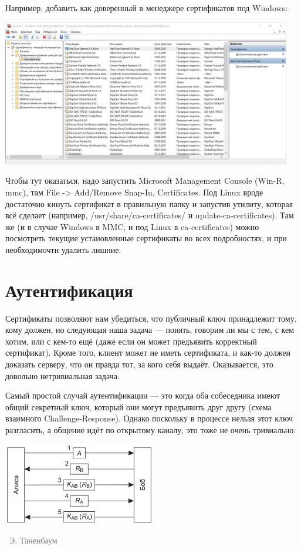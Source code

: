 \documentclass[a5paper]{article}
\newcommand{\attribution}[1] {
\vspace{-5mm}\begin{flushright}\begin{scriptsize}\textcolor{gray}{\textcopyright\, #1}\end{scriptsize}\end{flushright}
}
\begin{document}
Например, добавить как доверенный в менеджере сертификатов под Windows:

\begin{center}
    \includegraphics[width=0.95\textwidth]{windowsCertManager.png}
\end{center}

Чтобы тут оказаться, надо запустить Microsoft Management Console (Win-R, mmc), там File -> Add/Remove Snap-In, Certificates. Под Linux вроде достаточно кинуть сертификат в правильную папку и запустив утилиту, которая всё сделает (например, /usr/share/ca-certificates/ и update-ca-certificates). Там же (и в случае Windows в MMC, и под Linux в ca-certificates) можно посмотреть текущие установленные сертификаты во всех подробностях, и при необходимочти удалить лишние.

\section{Аутентификация}

Сертификаты позволяют нам убедиться, что публичный ключ принадлежит тому, кому должен, но следующая наша задача --- понять, говорим ли мы с тем, с кем хотим, или с кем-то ещё (даже если он может предъявить корректный сертификат). Кроме того, клиент может не иметь сертификата, и как-то должен доказать серверу, что он правда тот, за кого себя выдаёт. Оказывается, это довольно нетривиальная задача.

Самый простой случай аутентификации --- это когда оба собеседника имеют общий секретный ключ, который они могут предъявить друг другу (схема взаимного Challenge-Response). Однако поскольку в процессе нельзя этот ключ разгласить, а общение идёт по открытому каналу, это тоже не очень тривиально:

\begin{center}
    \includegraphics[width=0.5\textwidth]{challengeResponse.png}
    \attribution{Э. Таненбаум}
\end{center}
\end{document}

